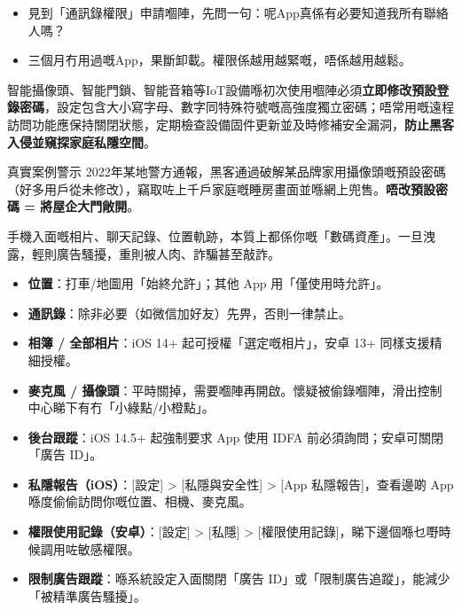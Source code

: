 \begin{itemize}
  \item 見到「通訊錄權限」申請嗰陣，先問一句：呢App真係有必要知道我所有聯絡人嗎？
  \item 三個月冇用過嘅App，果斷卸載。權限係越用越緊嘅，唔係越用越鬆。
\end{itemize}


智能攝像頭、智能門鎖、智能音箱等IoT設備喺初次使用嗰陣必須\textbf{立即修改預設登錄密碼}，設定包含大小寫字母、數字同特殊符號嘅高強度獨立密碼；唔常用嘅遠程訪問功能應保持關閉狀態，定期檢查設備固件更新並及時修補安全漏洞，\textbf{防止黑客入侵並窺探家庭私隱空間}。

\begin{tcbwarn}{真實案例警示}
2022年某地警方通報，黑客通過破解某品牌家用攝像頭嘅預設密碼（好多用戶從未修改），竊取咗上千戶家庭嘅睡房畫面並喺網上兜售。\textbf{唔改預設密碼 = 將屋企大門敞開}。

\end{tcbwarn}


手機入面嘅相片、聊天記錄、位置軌跡，本質上都係你嘅「數碼資產」。一旦洩露，輕則廣告騷擾，重則被人肉、詐騙甚至敲詐。


\begin{itemize}
  \item \textbf{位置}：打車/地圖用「始終允許」；其他 App 用「僅使用時允許」。
  \item \textbf{通訊錄}：除非必要（如微信加好友）先畀，否則一律禁止。
  \item \textbf{相簿 / 全部相片}：iOS 14+ 起可授權「選定嘅相片」，安卓 13+ 同樣支援精細授權。
  \item \textbf{麥克風 / 攝像頭}：平時關掉，需要嗰陣再開啟。懷疑被偷錄嗰陣，滑出控制中心睇下有冇「小綠點/小橙點」。
  \item \textbf{後台跟蹤}：iOS 14.5+ 起強制要求 App 使用 IDFA 前必須詢問；安卓可關閉「廣告 ID」。
\end{itemize}


\begin{itemize}
  \item \textbf{私隱報告（iOS）}：[設定] > [私隱與安全性] > [App 私隱報告]，查看邊啲 App 喺度偷偷訪問你嘅位置、相機、麥克風。
  \item \textbf{權限使用記錄（安卓）}：[設定] > [私隱] > [權限使用記錄]，睇下邊個喺乜嘢時候調用咗敏感權限。
  \item \textbf{限制廣告跟蹤}：喺系統設定入面關閉「廣告 ID」或「限制廣告追蹤」，能減少「被精準廣告騷擾」。
\end{itemize}

